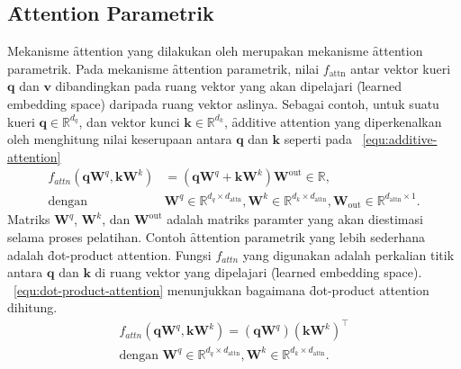 	\subsection{\f{Attention} Parametrik}
	Mekanisme \f{attention} yang dilakukan oleh \cite{transformerori} merupakan mekanisme \f{attention} parametrik. Pada mekanisme \f{attention} parametrik, nilai $f_{\text{attn}}$ antar vektor kueri $\mathbf{q}$ dan $\mathbf{v}$ dibandingkan pada ruang vektor yang akan dipelajari (\f{learned embedding space}) daripada ruang vektor aslinya. Sebagai contoh, untuk suatu kueri $\mathbf{q}\in \mathbb{R}^{d_q}$, dan vektor kunci $\mathbf{k} \in \mathbb{R}^{d_k}$, \f{additive attention} yang diperkenalkan oleh \cite{bahdanau2016neural} menghitung nilai keserupaan antara $\mathbf{q}$ dan $\mathbf{k}$ seperti pada \equ~\ref{equ:additive-attention}
	\begin{align}
	\label{equ:additive-attention}
	f_{attn}(\mathbf{q} \mathbf{W}^q, \mathbf{k} \mathbf{W}^k) &= (\mathbf{q} \mathbf{W}^q  + \mathbf{k} \mathbf{W}^k)  \mathbf{W}^{\text{out}} \in \mathbb{R}, \\
	\text{dengan } &\mathbf{W}^q \in \mathbb{R}^{d_q \times d_{\text{attn}}}, \mathbf{W}^k \in \mathbb{R}^{d_k \times d_{\text{attn}}}, \mathbf{W}_{\text{out}} \in \mathbb{R}^{d_{\text{attn}} \times 1}.
	\end{align}
	Matriks $\mathbf{W}^q$, $\mathbf{W}^k$, dan $\mathbf{W}^{\text{out}}$ adalah matriks paramter yang akan diestimasi selama proses pelatihan. Contoh \f{attention} parametrik yang lebih sederhana adalah \f{dot-product attention}. Fungsi $f_{attn}$ yang digunakan adalah perkalian titik antara $\mathbf{q}$ dan $\mathbf{k}$ di ruang vektor yang dipelajari (\f{learned embedding space}). \equ~\ref{equ:dot-product-attention} menunjukkan bagaimana \f{dot-product attention} dihitung.
	\begin{align}
		\label{equ:dot-product-attention}
		f_{attn}(\mathbf{q} \mathbf{W}^q, \mathbf{k} \mathbf{W}^k) = (\mathbf{q} \mathbf{W}^q) (\mathbf{k} \mathbf{W}^k)^{\top}\\
		\text{dengan } \mathbf{W}^q \in \mathbb{R}^{d_q \times d_{\text{attn}}}, \mathbf{W}^k \in \mathbb{R}^{d_k \times d_{\text{attn}}}.
	\end{align}

